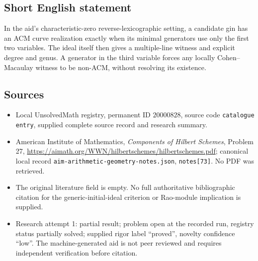\documentclass[11pt]{article}
\begin{document}
\subsection{Short English statement}
In the aid's characteristic-zero reverse-lexicographic setting, a candidate gin has an ACM curve realization exactly when its minimal generators use only the first two variables. The ideal itself then gives a multiple-line witness and explicit degree and genus. A generator in the third variable forces any locally Cohen--Macaulay witness to be non-ACM, without resolving its existence.
\subsection{Sources}
\begin{itemize}
\item Local UnsolvedMath registry, permanent ID $20000828$, source code \texttt{catalogue entry}, supplied complete source record and research summary.
\item American Institute of Mathematics, \emph{Components of Hilbert Schemes}, Problem 27, \url{https://aimath.org/WWN/hilbertschemes/hilbertschemes.pdf}; canonical local record \texttt{aim-arithmetic-geometry-notes.json}, \texttt{notes[73]}. No PDF was retrieved.
\item The original literature field is empty. No full authoritative bibliographic citation for the generic-initial-ideal criterion or Rao-module implication is supplied.
\item Research attempt 1: partial result; problem open at the recorded run, registry status partially solved; supplied rigor label ``proved'', novelty confidence ``low''. The machine-generated aid is not peer reviewed and requires independent verification before citation.
\end{itemize}
\end{document}
